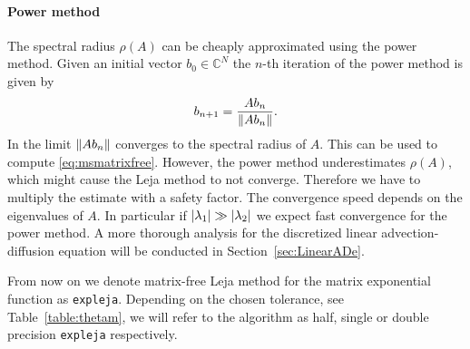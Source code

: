 \documentclass{scrartcl}
\begin{document}
	\paragraph{Power method}
	The spectral radius $\rho(A)$ can be cheaply approximated using the power method. 
	Given an initial vector $b_0\in\mathbb{C}^N$ the $n$-th iteration of the power method is given by
	\[
		b_{n+1} = \frac{Ab_n}{\lVert Ab_n\rVert}.
	\]
	In the limit $\lVert Ab_{n}\rVert$ converges to the spectral radius of $A$. This can be used to compute \eqref{eq:msmatrixfree}. However, the power method underestimates $\rho(A)$, which might cause the Leja method to not converge. Therefore we have to multiply the estimate with a safety factor. The convergence speed depends on the eigenvalues of $A$. In particular if $\lvert\lambda_{1}\rvert\gg\lvert\lambda_{2}\rvert$ we expect fast convergence for the power method. A more thorough analysis for the discretized linear advection-diffusion equation will be conducted in Section~\ref{sec:LinearADe}.

	From now on we denote matrix-free Leja method for the matrix exponential function as \texttt{expleja}. Depending on the chosen tolerance, see Table~\ref{table:thetam}, we will refer to the algorithm as half, single or double precision \texttt{expleja} respectively.
	
\end{document}
